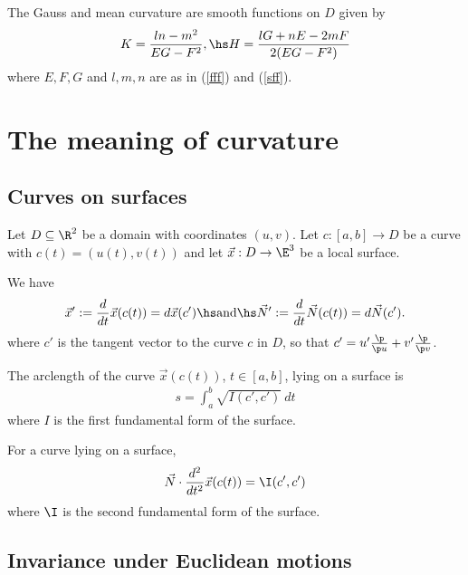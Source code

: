 \documentclass{article}
\begin{document}
\begin{proposition}[Notes 8.5]
	The Gauss and mean curvature are smooth functions on $D$ given by
	\begin{align*}
		K=\frac{ln-m^2}{EG-F^2},\hs
		H=\frac{lG+nE-2mF}{2(EG-F^2)}
	\end{align*}
	where $E,F,G$ and $l,m,n$ are as in (\ref{fff}) and (\ref{sff}).
\end{proposition}

\section{The meaning of curvature}

\subsection{Curves on surfaces}

Let $D\subseteq\R^2$ be a domain with coordinates $(u,v)$.
Let $c:[a,b]\to D$ be a curve with $c(t)=(u(t),v(t))$ and let $\vec x: D\to\E^3$ be a
local surface.

\begin{lemma}[Notes 9.1]
	We have
	\begin{align*}
		\vec x' := \frac{d}{dt}\vec x(c(t)) = d\vec x(c')\hs\text{and}\hs
		\vec N' := \frac{d}{dt}\vec N(c(t)) = d\vec N(c').
	\end{align*}
	where $c'$ is the tangent vector to the curve $c$ in $D$, so that
	$c'=u'\frac{\p }{\p u}+v'\frac{\p }{\p v}$.
\end{lemma}

\begin{proposition}[Notes 9.2]
	The arclength of the curve $\vec x(c(t))$, $t\in[a,b]$, lying on a surface is
	\begin{align*}
		s = \int_a^b \sqrt{I(c',c')}\:dt
	\end{align*}
	where $I$ is the first fundamental form of the surface.
\end{proposition}

\begin{proposition}[Notes 9.5]
	For a curve lying on a surface,
	\begin{align*}
		\vec N\cdot \frac{d^2}{dt^2}\vec x(c(t)) = \I(c',c')
	\end{align*}
	where $\I$ is the second fundamental form of the surface.
\end{proposition}

\subsection{Invariance under Euclidean motions}
\end{document}
